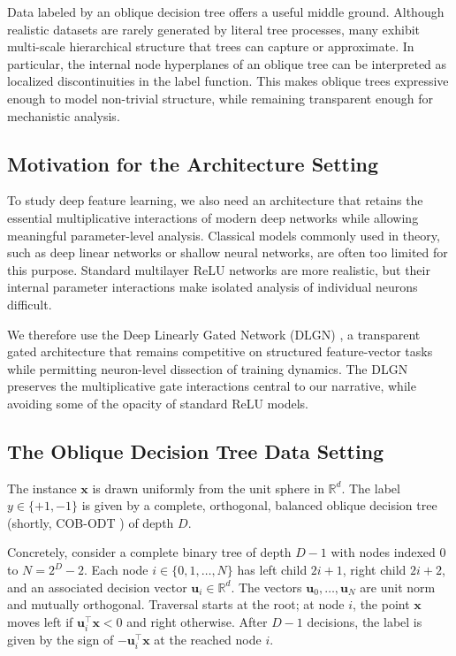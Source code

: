 \documentclass{article}
\theoremstyle{plain}
\theoremstyle{definition}
\theoremstyle{remark}
\newcommand{\R}{{\mathbb R}}
\newcommand{\1}{{\mathbf 1}}
\newcommand{\0}{{\mathbf 0}}
\newcommand{\x}{{\mathbf x}}
\newcommand{\bu}{{\mathbf u}}
\renewcommand{\>}{{\rightarrow}}
\begin{document}
Data labeled by an oblique decision tree \cite{Banerjee+25} offers a useful middle ground. Although realistic datasets are rarely generated by literal tree processes, many exhibit multi-scale hierarchical structure that trees can capture or approximate. In particular, the internal node hyperplanes of an oblique tree can be interpreted as localized discontinuities in the label function. This makes oblique trees expressive enough to model non-trivial structure, while remaining transparent enough for mechanistic analysis.

\subsection{Motivation for the Architecture Setting}

To study deep feature learning, we also need an architecture that retains the essential multiplicative interactions of modern deep networks while allowing meaningful parameter-level analysis. Classical models commonly used in theory, such as deep linear networks or shallow neural networks, are often too limited for this purpose. Standard multilayer ReLU networks are more realistic, but their internal parameter interactions make isolated analysis of individual neurons difficult.

We therefore use the Deep Linearly Gated Network (DLGN) \cite{Banerjee+25}, a transparent gated architecture that remains competitive on structured feature-vector tasks while permitting neuron-level dissection of training dynamics. The DLGN preserves the multiplicative gate interactions central to our narrative, while avoiding some of the opacity of standard ReLU models.

\subsection{The Oblique Decision Tree Data Setting}
\label{sec:ODT_intro}

The instance $\x$ is drawn uniformly from the unit sphere in $\R^d$. The label $y \in \{+1,-1\}$ is given by a complete, orthogonal, balanced oblique decision tree (shortly, COB-ODT  \cite{Banerjee+25}) of depth $D$.

Concretely, consider a complete binary tree of depth $D-1$ with nodes indexed $0$ to $N=2^D-2$. Each node $i \in \{0,1,\ldots,N\}$ has left child $2i+1$, right child $2i+2$, and an associated decision vector $\bu_i \in \R^d$. The vectors $\bu_0,\ldots,\bu_N$ are unit norm and mutually orthogonal. Traversal starts at the root; at node $i$, the point $\x$ moves left if $\bu_i^\top \x < 0$ and right otherwise. After $D-1$ decisions, the label is given by the sign of $-\bu_i^\top \x$ at the reached node $i$.
\end{document}
